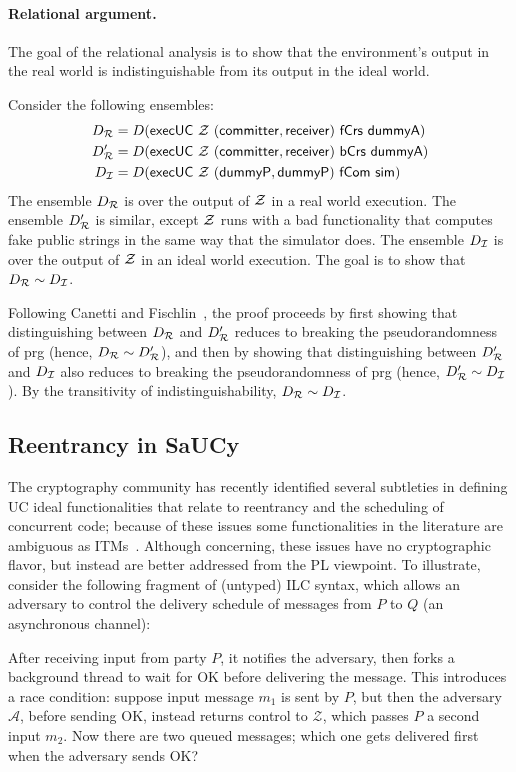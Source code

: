 \paragraph{Relational argument.} The goal of the relational analysis is to show
that the environment's output in the real world is indistinguishable from its
output in the ideal world.

\begin{sketch}
  Consider the following ensembles:
  \begin{align*}
    D_{\mathcal{{R}}} &= D(\mathsf{execUC~\mathcal{{Z}}~(committer, receiver)~fCrs~dummyA})\\
    D_{\mathcal{{R}}}' &= D(\mathsf{execUC~\mathcal{{Z}}~(committer, receiver)~bCrs~dummyA})\\
    D_{\mathcal{{I}}} &= D(\mathsf{execUC~\mathcal{{Z}}~(dummyP, dummyP)~fCom~sim})
  \end{align*}
  \noindent The ensemble $D_{\mathcal{{R}}}$ is over the output of $\mathcal{{Z}}$ in a real
  world execution. The ensemble $D_{\mathcal{{R}}}'$ is similar, except $\mathcal{{Z}}$ runs
  with a bad functionality that computes fake public strings in the same way
  that the simulator does. The ensemble $D_{\mathcal{{I}}}$ is over the output of
  $\mathcal{{Z}}$ in an ideal world execution. The goal is to show that $D_{\mathcal{{R}}} \sim
  D_{\mathcal{{I}}}$.
  
  Following Canetti and Fischlin~\cite{canetti2001commitments}, the proof
  proceeds by first showing that distinguishing between $D_{\mathcal{{R}}}$ and
  $D_{\mathcal{{R}}}'$ reduces to breaking the pseudorandomness of \textsf{prg} (hence,
  $D_{\mathcal{{R}}} \sim D_{\mathcal{{R}}}'$), and then by showing that distinguishing between
  $D_{\mathcal{{R}}}'$ and $D_{\mathcal{{I}}}$ also reduces to breaking the pseudorandomness
  of \textsf{prg} (hence, $D_{\mathcal{{R}}}' \sim D_{\mathcal{{I}}}$). By the transitivity of
  indistinguishability, $D_{\mathcal{{R}}} \sim D_{\mathcal{{I}}}$.
\end{sketch}

\subsection{Reentrancy in SaUCy}
\label{subsec:reentrancy}

The cryptography community has recently identified several subtleties in defining UC ideal functionalities that relate to reentrancy and the scheduling of concurrent code;
because of these issues some functionalities in the literature are ambiguous as ITMs~\cite{camenisch2016universal}.
Although concerning, these issues have no cryptographic flavor, but instead are better addressed from the PL viewpoint.
To illustrate, consider the following fragment of (untyped) ILC syntax, which allows an adversary to control the delivery schedule of messages from $P$ to $Q$ (an asynchronous channel):

After receiving input from party $P$, it
notifies the adversary, then forks a background thread to wait for \textsf{OK} before
delivering the message.
This introduces a race condition: suppose input message $m_1$ is sent by $P$, but then the adversary $\mathcal A$, before sending \textsf{OK}, instead returns control to $\mathcal Z$, which passes $P$ a second input $m_2$. Now there are two queued messages; which one gets delivered first when the adversary sends \textsf{OK}?

